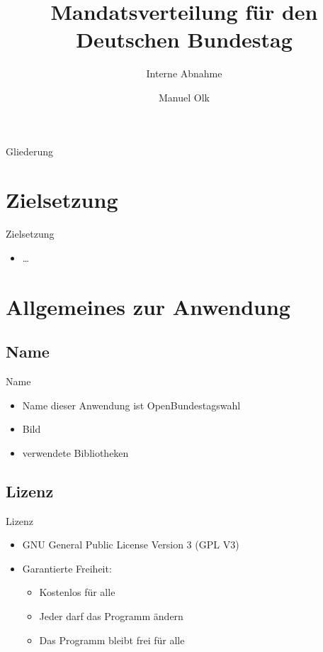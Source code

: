 \documentclass[18pt]{beamer}
\title[Interne Abnahme]{Mandatsverteilung für den Deutschen Bundestag}
\subtitle{Interne Abnahme}
\author{Manuel Olk}
\institute{Praxis der Softwareentwicklung, WS 2013/14}
\begin{document}

\begin{frame}
\titlepage
\end{frame}

\begin{frame}{Gliederung}
\tableofcontents
\end{frame}


\section{Zielsetzung}
\begin{frame}{Zielsetzung}
\begin{itemize}
	\item \dots
\end{itemize}
\end{frame}

\section{Allgemeines zur Anwendung}
\subsection{Name}
\begin{frame}{Name}
\begin{itemize}
	\item Name dieser Anwendung ist OpenBundestagswahl
	\item Bild
	\item verwendete Bibliotheken
\end{itemize}
\end{frame}


\subsection{Lizenz}
\begin{frame}{Lizenz}
\begin{itemize}
	\item GNU General Public License Version 3 (GPL V3)
	\item Garantierte Freiheit:
	\begin{itemize}
		\item Kostenlos für alle
		\item Jeder darf das Programm ändern
		\item Das Programm bleibt frei für alle
	\end{itemize}
	
\end{itemize}
\end{frame}
\end{document}
